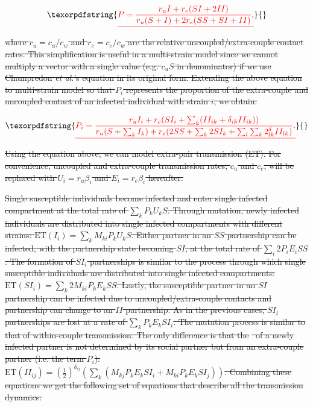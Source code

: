 \documentclass[10pt,letterpaper]{article}
\newcommand{\Lspvl}{$\log_{10}$ SPVL}
\newcommand{\etal}{\textit{et al.}}
\newcommand{\ET}{\textrm{ET}}
\providecommand{\DIFdeltex}[1]{{\protect\color{red}\sout{#1}}}                      %
\providecommand{\DIFdel}[1]{\texorpdfstring{\DIFdeltex{#1}}{}} %
\begin{document}
\begin{displaymath}
\DIFdel{P = \frac{r_u I + r_e (SI + 2 II)}{r_u (S + I) + 2 r_e(SS + SI + II)},
}\end{displaymath}
\DIFdel{where $r_u = c_u/c_w$ and $r_e = c_e/c_w$ are the relative uncoupled/extra-couple contact rates. This simplification is useful in a multi-strain model since we cannot multiply a vector with a single value (e.g. $c_u S$ in denominator) if we use Champredon \etal's equation in its original form. Extending the above equation to multi-strain model so that $P_i$ represents the proportion of the extra-couple and uncoupled contact of an infected individual with strain $i$, we obtain:
}%

\begin{displaymath}
\DIFdel{P_i = \frac{r_u I_i + r_e (SI_i + \sum_k (II_{ik} + \delta_{ik} II_{ik}))}{r_u (S + \sum_k I_k) + r_e(2 SS + \sum_k 2 SI_k + \sum_l \sum_k 2^\delta_{lk} II_{lk} )}.
}\end{displaymath}
\DIFdel{Using the equation above, we can model extra-pair transmission (ET). For convenience, uncoupled and extra-couple transmission rates, $c_u$ and $c_e$, will be replaced with $U_i = r_u \beta_i$ and $E_i = r_e \beta_i$ hereafter.
}%

\DIFdel{Single susceptible individuals become infected and enter single infected compartment at the total rate of $\sum_k P_k U_k S$. Through mutation, newly infected individuals are distributed into single infected compartments with different strains: $\ET(I_i) = \sum_k M_{ki} P_k U_k S$. Either partner in an $SS$ partnership can be infected, with the partnership state becoming $SI$, at the total rate of $\sum_i 2 P_i E_i SS$. The formation of $SI_i$ partnerships is similar to the process through which single susceptible individuals are distributed into single infected compartments: $\ET(SI_i) = \sum_k 2 M_{ki} P_k E_k SS$. Lastly, the susceptible partner in an $SI$ partnership can be infected due to uncoupled/extra-couple contacts and partnership can change to an $II$ partnership. As in the previous cases, $SI_i$ partnerships are lost at a rate of $\sum_k P_k E_k SI_i$. The mutation process is similar to that of within-couple transmission. The only difference is that the }%
\DIFdel{\ of a newly infected partner is not determined by its social partner but from an extra-couple partner (i.e. the term $P_i$): $\ET(II_{ij}) = (\frac{1}{2})^{\delta_{ij}}(\sum_k (M_{kj} P_k E_k SI_i + M_{ki} P_k E_k SI_j))$. Combining these equations we get the following set of equations that describe all the transmission dynamics:
}%
\end{document}
